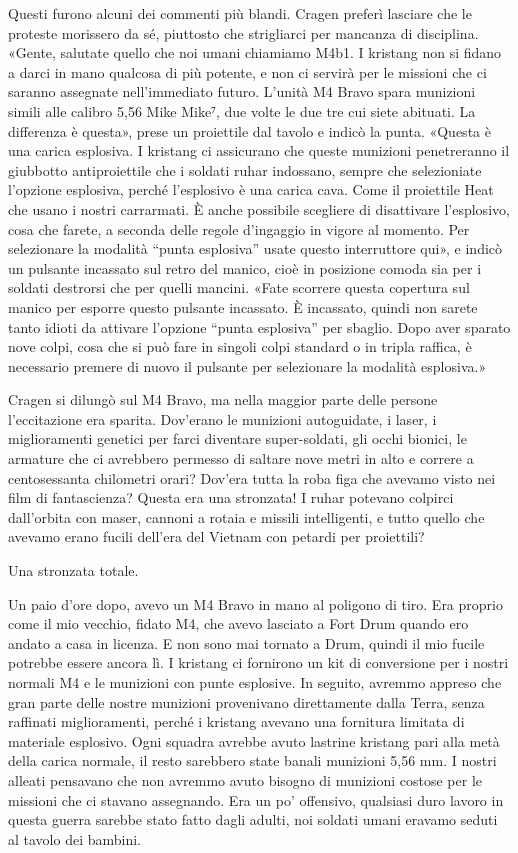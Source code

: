 Questi furono alcuni dei commenti più blandi. Cragen preferì lasciare
che le proteste morissero da sé, piuttosto che strigliarci per mancanza
di disciplina. «Gente, salutate quello che noi umani chiamiamo M4b1. I
kristang non si fidano a darci in mano qualcosa di più potente, e non ci
servirà per le missioni che ci saranno assegnate nell'immediato futuro.
L'unità M4 Bravo spara munizioni simili alle calibro 5,56 Mike Mike⁷,
due volte le due tre cui siete abituati. La differenza è questa», prese
un proiettile dal tavolo e indicò la punta. «Questa è una carica
esplosiva. I kristang ci assicurano che queste munizioni penetreranno il
giubbotto antiproiettile che i soldati ruhar indossano, sempre che
selezioniate l'opzione esplosiva, perché l'esplosivo è una carica cava.
Come il proiettile Heat che usano i nostri carrarmati. È anche possibile
scegliere di disattivare l'esplosivo, cosa che farete, a seconda delle
regole d'ingaggio in vigore al momento. Per selezionare la modalità
``punta esplosiva'' usate questo interruttore qui», e indicò un pulsante
incassato sul retro del manico, cioè in posizione comoda sia per i
soldati destrorsi che per quelli mancini. «Fate scorrere questa
copertura sul manico per esporre questo pulsante incassato. È incassato,
quindi non sarete tanto idioti da attivare l'opzione ``punta esplosiva''
per sbaglio. Dopo aver sparato nove colpi, cosa che si può fare in
singoli colpi standard o in tripla raffica, è necessario premere di
nuovo il pulsante per selezionare la modalità esplosiva.»

Cragen si dilungò sul M4 Bravo, ma nella maggior parte delle persone
l'eccitazione era sparita. Dov'erano le munizioni autoguidate, i laser,
i miglioramenti genetici per farci diventare super-soldati, gli occhi
bionici, le armature che ci avrebbero permesso di saltare nove metri in
alto e correre a centosessanta chilometri orari? Dov'era tutta la roba
figa che avevamo visto nei film di fantascienza? Questa era una
stronzata! I ruhar potevano colpirci dall'orbita con maser, cannoni a
rotaia e missili intelligenti, e tutto quello che avevamo erano fucili
dell'era del Vietnam con petardi per proiettili?

Una stronzata totale.

\hfill\break

Un paio d'ore dopo, avevo un M4 Bravo in mano al poligono di tiro. Era
proprio come il mio vecchio, fidato M4, che avevo lasciato a Fort Drum
quando ero andato a casa in licenza. E non sono mai tornato a Drum,
quindi il mio fucile potrebbe essere ancora lì. I kristang ci fornirono
un kit di conversione per i nostri normali M4 e le munizioni con punte
esplosive. In seguito, avremmo appreso che gran parte delle nostre
munizioni provenivano direttamente dalla Terra, senza raffinati
miglioramenti, perché i kristang avevano una fornitura limitata di
materiale esplosivo. Ogni squadra avrebbe avuto lastrine kristang pari
alla metà della carica normale, il resto sarebbero state banali
munizioni 5,56 mm. I nostri alleati pensavano che non avremmo avuto
bisogno di munizioni costose per le missioni che ci stavano assegnando.
Era un po' offensivo, qualsiasi duro lavoro in questa guerra sarebbe
stato fatto dagli adulti, noi soldati umani eravamo seduti al tavolo dei
bambini.

